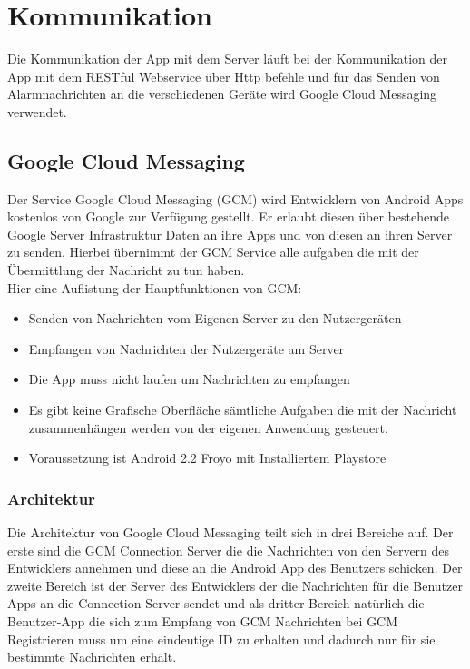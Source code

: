 \section{Kommunikation}
Die Kommunikation der App mit dem Server läuft bei der Kommunikation der App mit dem RESTful Webservice über Http befehle und für das Senden von Alarmnachrichten an die verschiedenen Geräte  wird Google Cloud Messaging verwendet.
\subsection*{Google Cloud Messaging}
Der Service Google Cloud Messaging (GCM) wird Entwicklern von Android Apps kostenlos von Google zur Verfügung gestellt. Er erlaubt diesen über bestehende Google Server Infrastruktur Daten an ihre Apps  und von diesen an ihren Server zu senden. Hierbei übernimmt der GCM Service alle aufgaben die mit der Übermittlung  der Nachricht zu tun haben.\\

Hier eine Auflistung der Hauptfunktionen von GCM:

\begin{itemize}
	\item Senden von Nachrichten vom Eigenen Server zu den Nutzergeräten
	\item Empfangen von Nachrichten der Nutzergeräte am Server
	\item Die App muss nicht laufen um Nachrichten zu empfangen
	\item Es gibt keine Grafische Oberfläche sämtliche Aufgaben die mit der Nachricht zusammenhängen werden von der eigenen Anwendung gesteuert.
	\item Voraussetzung ist Android 2.2 Froyo mit Installiertem Playstore
\end{itemize}

\subsubsection*{Architektur}
Die Architektur von Google Cloud Messaging  teilt sich in drei Bereiche auf. Der erste sind die GCM Connection Server die die Nachrichten von den Servern des Entwicklers annehmen und diese an die Android App des Benutzers schicken. Der zweite Bereich ist der Server des Entwicklers der die Nachrichten für die Benutzer Apps an die Connection Server sendet und als dritter Bereich natürlich die Benutzer-App die sich zum Empfang von GCM Nachrichten bei GCM Registrieren muss um eine eindeutige ID zu erhalten und dadurch nur für sie bestimmte  Nachrichten erhält.\\

